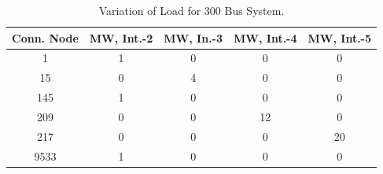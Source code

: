 \documentclass[preprint,12pt,3p]{elsarticle}
\begin{document}
	\begin{table}[ht] 
		
		\caption{Variation of Load for 300 Bus System.} %
		
		\centering %
		
		\begin{tabular}{| c | c | c | c | c |} %
			
			\hline\hline %
			
			Conn. Node & MW, Int.-2 & MW, In.-3 & MW, Int.-4  & MW, Int.-5 \\ [0.5ex] %
			
			
			\hline %
			
			1 &	1 &	0 &	0 &	0 \\ %
			\hline
			15 &	0 &	4 &	0 &	0 \\ %
			\hline
			145 &	1 &	0 &	0 &	0 \\ %
			\hline
			209 &	0 &	0 &	12 &	0 \\ %
			\hline
			217 &	0 &	0 &	0 &	20 \\ %
			\hline
			9533 &	1 &	0 &	0 &	0 \\ %
			
			\hline
		\end{tabular} 
		
		\label{table:300LASCOPFLoadModified} %
		
	\end{table}
	\iffalse
\end{document}
